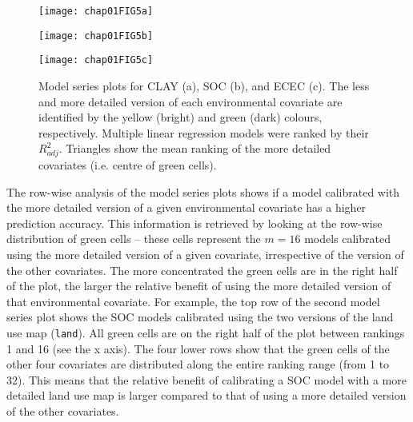 \begin{figure}[!ht]
  \centering
    \begin{minipage}[b]{\textwidth}
      \subcaption{}
      \texttt{[image: chap01FIG5a]}
    \end{minipage}
    \begin{minipage}[b]{\textwidth}
      \subcaption{}
      \texttt{[image: chap01FIG5b]}
    \end{minipage}
    \begin{minipage}[b]{\textwidth}
      \subcaption{}
      \texttt{[image: chap01FIG5c]}
    \end{minipage}
  \caption{Model series plots for CLAY (a), SOC (b), and ECEC (c). The less and 
  more detailed version of each environmental covariate are identified by the 
  yellow (bright) and green (dark) colours, respectively. Multiple linear 
  regression models were ranked by their ${R}^{2}_{adj}$. Triangles show the 
  mean ranking of the more detailed covariates (i.e. centre of green cells).}
  \label{fig:model-series}
\end{figure}

The row-wise analysis of the model series plots shows if a model calibrated with the more detailed version of 
a given environmental covariate has a higher prediction accuracy. This information is retrieved by looking at 
the row-wise distribution of green cells -- these cells represent the $m=16$ models calibrated using the more 
detailed version of a given covariate, irrespective of the version of the other covariates. The more 
concentrated the green cells are in the right half of the plot, the larger the relative benefit of using the
more detailed version of that environmental covariate. For example, the top row of the second model series 
plot shows the SOC models calibrated using the two versions of the land use map (\texttt{land}). All green 
cells are on the right half of the plot between rankings 1 and 16 (see the x axis). The four lower rows
show that the green cells of the other four covariates are distributed along the entire ranking range (from 1 
to 32). This means that the relative benefit of calibrating a SOC model with a more detailed land use map is 
larger compared to that of using a more detailed version of the other covariates.

